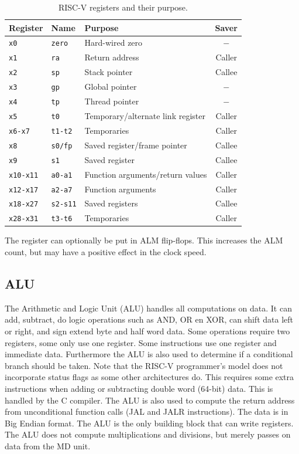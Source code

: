 \documentclass[12pt]{article}
\begin{document}
\begin{table}[!ht]
\centering
\caption{RISC-V registers and their purpose.}
\label{tab:registers}
\begin{tabular}{lllc}
Register & Name & Purpose & Saver \\
\midrule
\texttt{x0}      & \texttt{zero}   & Hard-wired zero                   & $-$ \\
\texttt{x1}      & \texttt{ra}     & Return address                    & Caller \\
\texttt{x2}      & \texttt{sp}     & Stack pointer                     & Callee \\
\texttt{x3}      & \texttt{gp}     & Global pointer                    & $-$ \\
\texttt{x4}      & \texttt{tp}     & Thread pointer                    & $-$ \\
\texttt{x5}      & \texttt{t0}     & Temporary/alternate link register & Caller \\
\texttt{x6-x7}   & \texttt{t1-t2}  & Temporaries                       & Caller \\
\texttt{x8}      & \texttt{s0/fp}  & Saved register/frame pointer      & Callee \\
\texttt{x9}      & \texttt{s1}     & Saved register                    & Callee \\
\texttt{x10-x11} & \texttt{a0-a1}  & Function arguments/return values  & Caller \\
\texttt{x12-x17} & \texttt{a2-a7}  & Function arguments                & Caller \\
\texttt{x18-x27} & \texttt{s2-s11} & Saved registers                   & Callee \\
\texttt{x28-x31} & \texttt{t3-t6}  & Temporaries                       & Caller
\end{tabular}
\end{table}

The register can optionally be put in ALM flip-flops. This increases the ALM count, but may have a positive effect in the clock speed.

\subsection{ALU}
\label{sec:alu}
The Arithmetic and Logic Unit (ALU) handles all computations on data. It can add, subtract, do logic operations such as AND, OR en XOR, can shift data left or right, and sign extend byte and half word data. Some operations require two registers, some only use one register. Some instructions use one register and immediate data. Furthermore the ALU is also used to determine if a conditional branch should be taken. Note that the RISC-V programmer's model does not incorporate status flags as some other architectures do. This requires some extra instructions when adding or subtracting double word (64-bit) data. This is handled by the C compiler. The ALU is also used to compute the return address from unconditional function calls (JAL and JALR instructions). The data is in Big Endian format. The ALU is the only building block that can write registers. The ALU does not compute multiplications and divisions, but merely passes on data from the MD unit.
\end{document}
